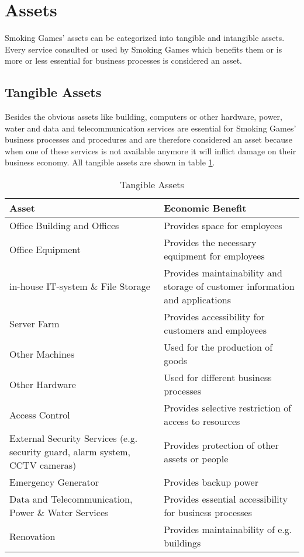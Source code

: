 \newpage
\section{Assets}
Smoking Games' assets can be categorized into tangible and intangible assets. Every service consulted or used by Smoking Games which benefits them or is more or less essential for business processes is considered an asset.
\subsection{Tangible Assets}
Besides the obvious assets like building, computers or other hardware, power, water and data and telecommunication services are essential for Smoking Games' business processes and procedures and are therefore considered an asset because when one of these services is not available anymore it will inflict damage on their business economy. All tangible assets are shown in table \ref{tab:TangibleAssets}.
\begin{table}[h]
	\centering
	\begin{tabular}{l | l}
		\textbf{Asset} & \textbf{Economic Benefit}\\\hline\hline
		\parbox[t]{6cm}{Office Building and Offices} & \parbox[t]{6cm}{Provides space for employees}\\\hline
		\parbox[t]{6cm}{Office Equipment} & \parbox[t]{6cm}{Provides the necessary equipment for employees}\\\hline
		\parbox[t]{6cm}{in-house IT-system \& File Storage} & \parbox[t]{6cm}{Provides maintainability and storage of customer information and applications}\\\hline
		\parbox[t]{6cm}{Server Farm} & \parbox[t]{6cm}{Provides accessibility for customers and employees}\\\hline
		\parbox[t]{6cm}{Other Machines} & \parbox[t]{6cm}{Used for the production of goods}\\\hline
		\parbox[t]{6cm}{Other Hardware} & \parbox[t]{6cm}{Used for different business processes}\\\hline
		\parbox[t]{6cm}{Access Control} & \parbox[t]{6cm}{Provides selective restriction of access to resources}\\\hline
		\parbox[t]{6cm}{External Security Services (e.g. security guard, alarm system, CCTV cameras)} & \parbox[t]{6cm}{Provides protection of other assets or people}\\\hline
		\parbox[t]{6cm}{Emergency Generator} & \parbox[t]{6cm}{Provides backup power}\\\hline
		\parbox[t]{6cm}{Data and Telecommunication, Power \& Water Services} & \parbox[t]{6cm}{Provides essential accessibility for business processes}\\\hline
		\parbox[t]{6cm}{Renovation} & \parbox[t]{6cm}{Provides maintainability of e.g. buildings}\\
	\end{tabular}
	\caption{Tangible Assets}\label{tab:TangibleAssets}
\end{table}
